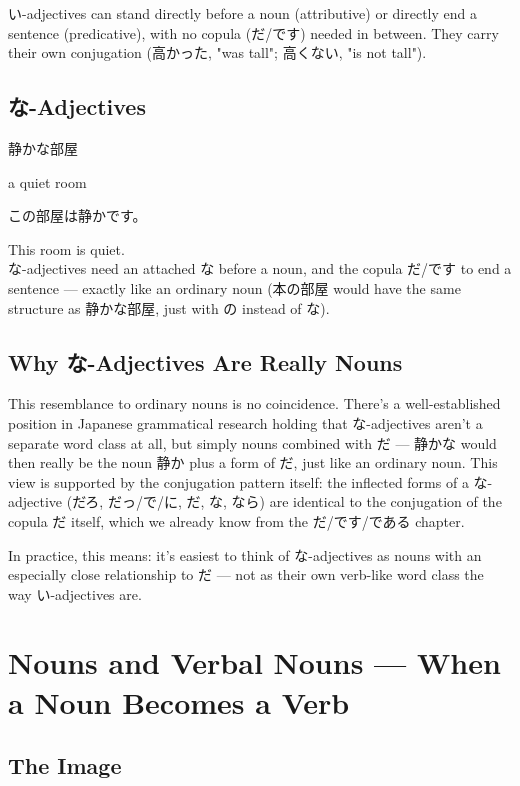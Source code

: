 \documentclass[12pt]{book}
\begin{document}
い-adjectives can stand directly before a noun (attributive) or directly end a sentence (predicative), with no copula (だ/です) needed in between. They carry their own conjugation (高かった, "was tall"; 高くない, "is not tall").

\section*{な-Adjectives}

\par\quad 静かな部屋\\
\par\quad a quiet room\\

\par\quad この部屋は静かです。\\
\par\quad This room is quiet.\\

な-adjectives need an attached な before a noun, and the copula だ/です to end a sentence — exactly like an ordinary noun (本の部屋 would have the same structure as 静かな部屋, just with の instead of な).

\section*{Why な-Adjectives Are Really Nouns}

This resemblance to ordinary nouns is no coincidence. There's a well-established position in Japanese grammatical research holding that な-adjectives aren't a separate word class at all, but simply nouns combined with だ — 静かな would then really be the noun 静か plus a form of だ, just like an ordinary noun. This view is supported by the conjugation pattern itself: the inflected forms of a な-adjective (だろ, だっ/で/に, だ, な, なら) are identical to the conjugation of the copula だ itself, which we already know from the だ/です/である chapter.

In practice, this means: it's easiest to think of な-adjectives as nouns with an especially close relationship to だ — not as their own verb-like word class the way い-adjectives are.


\chapter{Nouns and Verbal Nouns — When a Noun Becomes a Verb}

\section*{The Image}
\end{document}
